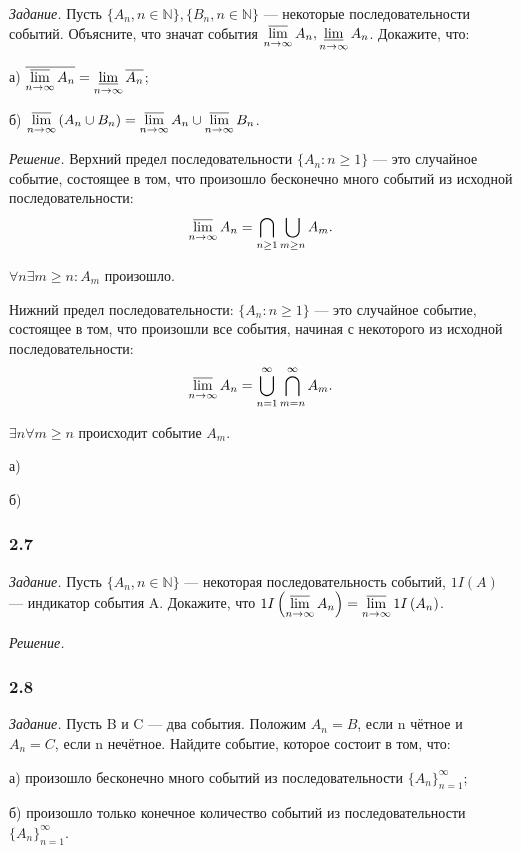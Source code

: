 \documentclass{book}
\begin{document}
\textit{Задание.} Пусть $\{A_n, n\in\mathbb{N}\}, \{B_n, n\in\mathbb{N}\}$ --- некоторые последовательности событий. Объясните, что значат события $\varlimsup\limits_{n\to\infty}A_n, \varliminf\limits_{n\to\infty}A_n$. Докажите, что:

а) $\overline{\varlimsup\limits_{n\to\infty}A_n}=\varliminf\limits_{n\to\infty}\overline{A_n}$;

б) $\varlimsup\limits_{n\to\infty}\left(A_n\cup B_n\right)=\varlimsup\limits_{n\to\infty}A_n\cup\varlimsup\limits_{n\to\infty}B_n$.

\textit{Решение.} Верхний предел последовательности $\{A_n: n\geq 1\}$ --- это случайное событие, состоящее в том, что произошло бесконечно много событий из исходной последовательности: $$\varlimsup\limits_{n\to\infty}A_n=\bigcap\limits_{n\geq 1}\bigcup\limits_{m\geq n}A_m.$$

$\forall n \exists m\geq n: A_m$ произошло.

Нижний предел последовательности: $\{A_n: n\geq 1\}$ --- это случайное событие, состоящее в том, что произошли все события, начиная с некоторого из исходной последовательности: $$\varlimsup\limits_{n\to\infty}A_n=\bigcup\limits_{n=1}^\infty\bigcap\limits_{m=n}^\infty A_m.$$

$\exists n \forall m\geq n$ происходит событие $A_m$.

а)

б)

\subsubsection*{2.7}

\textit{Задание.} Пусть $\{A_n, n\in\mathbb{N}\}$ --- некоторая последовательность событий, $1I(A)$ --- индикатор события A. Докажите, что $1I\left(\varlimsup\limits_{n\to\infty}A_n\right)=\varlimsup\limits_{n\to\infty}1I\left(A_n\right)$.

\textit{Решение.}

\subsubsection*{2.8}

\textit{Задание.} Пусть B и C --- два события. Положим $A_n=B$, если n чётное и $A_n=C$, если n нечётное. Найдите событие, которое состоит в том, что:

а) произошло бесконечно много событий из последовательности $\{A_n\}_{n=1}^\infty$;

б) произошло только конечное количество событий из последовательности $\{A_n\}_{n=1}^\infty$.
\end{document}
